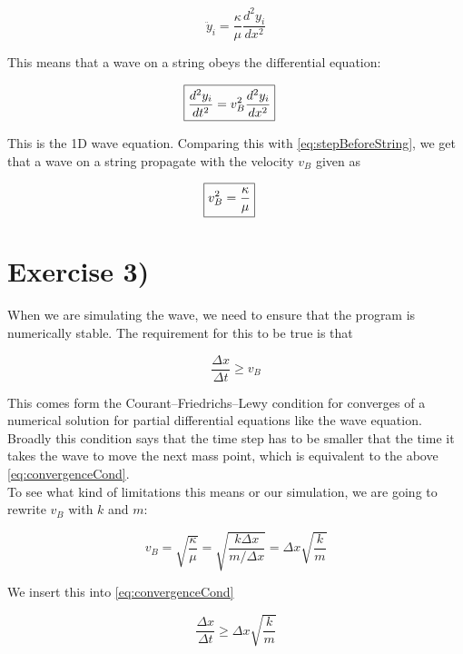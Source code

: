 \documentclass[a4paper,norsk, 10pt]{article}
\begin{document}
\begin{equation}
\ddot{y}_i = \frac{\kappa}{\mu}\frac{d^2y_i}{dx^2}
\label{eq:stepBeforeString}
\end{equation}

This means that a wave on a string obeys the differential equation:

\begin{align}
\Aboxed{
\frac{d^2y_i}{dt^2} = v_B^2\frac{d^2y_i}{dx^2}
}
\end{align}

This is the 1D wave equation. Comparing this with \eqref{eq:stepBeforeString}, we get that a wave on a string propagate with the velocity $v_B$ given as

\begin{align}
\Aboxed{
v_B^2 = \frac{\kappa}{\mu}
}
\end{align}




\newpage
\section{Exercise 3)}

When we are simulating the wave, we need to ensure that the program is numerically stable. The requirement for this to be true is that 

\begin{equation}
\frac{\Delta x}{\Delta t} \geq v_B
\label{eq:convergenceCond}
\end{equation}

This comes form the Courant–Friedrichs–Lewy condition for converges of a numerical solution for partial differential equations like the wave equation. Broadly this condition says that the time step has to be smaller that the time it takes the wave to move the next mass point, which is equivalent to the above \eqref{eq:convergenceCond}.\\

To see what kind of limitations this means or our simulation, we are going to rewrite $v_B$ with $k$ and $m$:

\begin{equation}
v_B = \sqrt{\frac{\kappa}{\mu}} = \sqrt{\frac{k\Delta x}{m/\Delta x}} = \Delta x\sqrt{\frac{k}{m}}
\end{equation}

We insert this into \eqref{eq:convergenceCond} 

\begin{equation}
\frac{\Delta x}{\Delta t} \geq \Delta x\sqrt{\frac{k}{m}}  
\end{equation}
\end{document}
